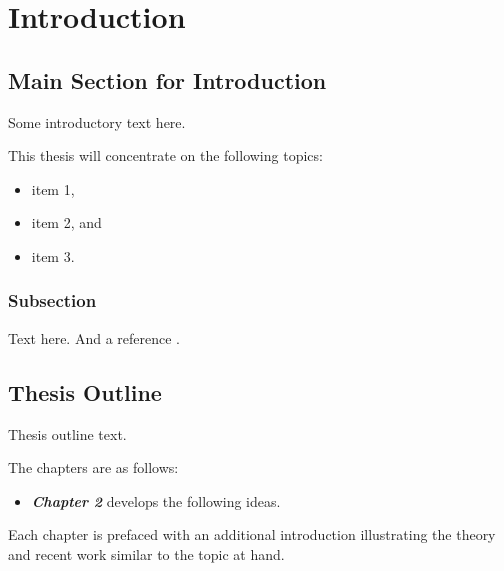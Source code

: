 \chapter{Introduction}\label{chap:intro}
\section{Main Section for Introduction}
Some introductory text here.

This thesis will concentrate on the following topics:
\begin{itemize}[noitemsep,topsep=0pt]
\item item 1,
\item item 2, and
\item item 3.
\end{itemize}

\subsection{Subsection}

Text here. And a reference \cite{Author1990}.

\section{Thesis Outline}
Thesis outline text.

The chapters are as follows:
\begin{itemize}
\item \textit{\textbf{Chapter 2}} develops the following ideas.
\end{itemize}
Each chapter is prefaced with an additional introduction illustrating the theory and recent work similar to the topic at hand.